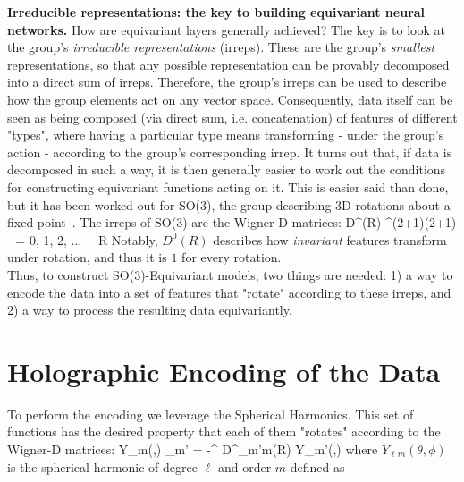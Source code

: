 \textbf{Irreducible representations: the key to building equivariant neural networks.} How are
equivariant layers generally achieved? The key is to look at the group's \textit{irreducible
representations} (irreps). These are the group's \textit{smallest} representations, so that any
possible representation can be provably decomposed into a direct sum of irreps. Therefore, the
group's irreps can be used to describe how the group elements act on any vector space.
Consequently, data itself can be seen as being composed (via direct sum, i.e. concatenation) of
features of different "types", where having a particular type means transforming - under the
group's action - according to the group's corresponding irrep. It turns out that, if data is
decomposed in such a way, it is then generally easier to work out the conditions for constructing
equivariant functions acting on it. This is easier said than done, but it has been worked out for
SO(3), the group describing 3D rotations about a fixed point~\citep{geiger_e3nn_2022,
kondor_clebsch-gordan_2018, thomas_tensor_2018}. The irreps of SO(3) are the Wigner-D matrices:
\EQ
        D^{\ell}(R) \in {}^{(2\ell+1)\times(2\ell+1)} \quad {} \,\, \ell = 0,
        1, 2, ... \,\,\,\, R \in {}
        \label{eq:WignerD}
\EE
Notably, $D^0(R)$ describes how \textit{invariant} features transform under rotation, and thus it
is $1$ for every rotation.\\
Thus, to construct SO(3)-Equivariant models, two things are needed: 1) a way to encode the data
into a set of features that "rotate" according to these irreps, and 2) a way to process the
resulting data equivariantly.

\section{Holographic Encoding of the Data}
\label{sec:encoding}

To perform the encoding we leverage the Spherical Harmonics. This set of functions has the desired
property that each of them "rotates" according to the Wigner-D matrices:
\EQ
	Y_{\ell m}(\theta,\phi) \sum_{m' = -\ell}^\ell
	D^{\ell}_{m'm}(R) Y_{\ell m'}(\theta,\phi)
	\label{eq:YLMWignerD}
\EE
where $Y_{\ell m}(\theta,\phi)$ is the spherical harmonic of degree $\ell$ and order $m$ defined as

